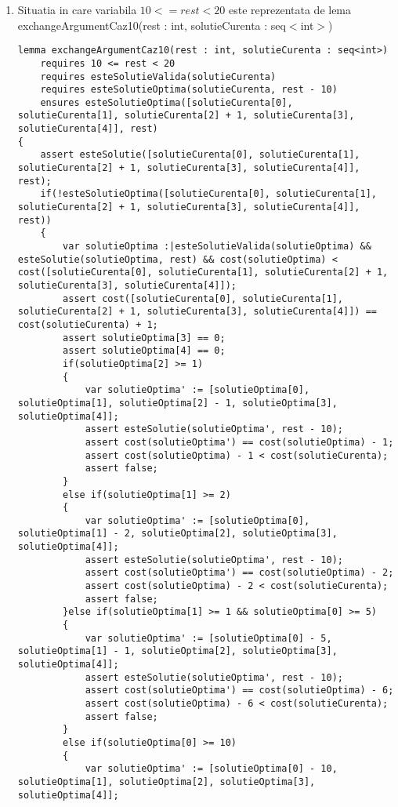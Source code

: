 \begin{enumerate}
\item Situatia in care variabila $10 <= rest <20$ este reprezentata de lema exchangeArgumentCaz10(rest : int, solutieCurenta : seq$<$int$>$)
\par 
	
\begin{lstlisting}
lemma exchangeArgumentCaz10(rest : int, solutieCurenta : seq<int>)
	requires 10 <= rest < 20
	requires esteSolutieValida(solutieCurenta)
	requires esteSolutieOptima(solutieCurenta, rest - 10)
	ensures esteSolutieOptima([solutieCurenta[0], solutieCurenta[1], solutieCurenta[2] + 1, solutieCurenta[3], solutieCurenta[4]], rest)
{
	assert esteSolutie([solutieCurenta[0], solutieCurenta[1], solutieCurenta[2] + 1, solutieCurenta[3], solutieCurenta[4]], rest);
	if(!esteSolutieOptima([solutieCurenta[0], solutieCurenta[1], solutieCurenta[2] + 1, solutieCurenta[3], solutieCurenta[4]], rest))
	{
		var solutieOptima :|esteSolutieValida(solutieOptima) && esteSolutie(solutieOptima, rest) && cost(solutieOptima) < cost([solutieCurenta[0], solutieCurenta[1], solutieCurenta[2] + 1, solutieCurenta[3], solutieCurenta[4]]);
		assert cost([solutieCurenta[0], solutieCurenta[1], solutieCurenta[2] + 1, solutieCurenta[3], solutieCurenta[4]]) == cost(solutieCurenta) + 1;
		assert solutieOptima[3] == 0;
		assert solutieOptima[4] == 0;
		if(solutieOptima[2] >= 1)
		{
			var solutieOptima' := [solutieOptima[0], solutieOptima[1], solutieOptima[2] - 1, solutieOptima[3], solutieOptima[4]];
			assert esteSolutie(solutieOptima', rest - 10);
			assert cost(solutieOptima') == cost(solutieOptima) - 1;
			assert cost(solutieOptima) - 1 < cost(solutieCurenta);
			assert false;
		}
		else if(solutieOptima[1] >= 2)
		{
			var solutieOptima' := [solutieOptima[0], solutieOptima[1] - 2, solutieOptima[2], solutieOptima[3], solutieOptima[4]];
			assert esteSolutie(solutieOptima', rest - 10);
			assert cost(solutieOptima') == cost(solutieOptima) - 2;
			assert cost(solutieOptima) - 2 < cost(solutieCurenta);
			assert false;
		}else if(solutieOptima[1] >= 1 && solutieOptima[0] >= 5)
		{
			var solutieOptima' := [solutieOptima[0] - 5, solutieOptima[1] - 1, solutieOptima[2], solutieOptima[3], solutieOptima[4]];
			assert esteSolutie(solutieOptima', rest - 10);
			assert cost(solutieOptima') == cost(solutieOptima) - 6;
			assert cost(solutieOptima) - 6 < cost(solutieCurenta);
			assert false;
		}
		else if(solutieOptima[0] >= 10)
		{
			var solutieOptima' := [solutieOptima[0] - 10, solutieOptima[1], solutieOptima[2], solutieOptima[3], solutieOptima[4]];

\end{lstlisting}
\end{enumerate}
